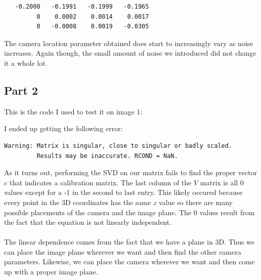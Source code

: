 \documentclass[11pt,psfig]{article}
\begin{document}
\begin{verbatim}
   -0.2000   -0.1991   -0.1999   -0.1965
         0    0.0002    0.0014    0.0017
         0   -0.0008    0.0019   -0.0305
\end{verbatim} 

The camera location parameter obtained does start to increasingly vary as noise increases. Again though, the small amount of noise we introduced did not change it a whole lot. 

\subsection{Part 2}

This is the code I used to test it on image 1:

I ended up getting the following error:
\begin{verbatim}
Warning: Matrix is singular, close to singular or badly scaled.
         Results may be inaccurate. RCOND = NaN. 
\end{verbatim}
As it turns out, performing the SVD on our matrix fails to find the proper vector $c$ that indicates a calibration matrix. The last column of the $V$ matrix is all 0 values except for a -1 in the second to last entry. This likely occured because every point in the 3D coordinates has the same $z$ value so there are many possible placements of the camera and the image plane. The 0 values result from the fact that the equation is not linearly independent. \\
\\
The linear dependence comes from the fact that we have a plane in 3D. Thus we can place the image plane wherever we want and then find the other camera parameters. Likewise, we can place the camera wherever we want and then come up with a proper image plane. 
\end{document}
